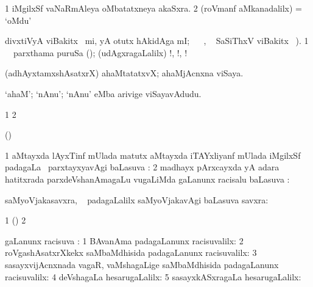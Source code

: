 \bentry
{}
\gl{\nA}
\bmng
\bnum
\num{1} iMgilxSf vaNaRmAleya oMbatatxneya akaSxra. 
\num{2} (roVmanf aMkanadalilx) =  `oMdu'  
\enum
\emng
\eentry

\bentry
{}
\gl{\sanA}
\bmng
 divxtiVyA viBakitx  \ucAcx\ mi, yA otutx hAkidAga mI; \AtAmx\  \pArxparx\ , \bava\  SaSiThxV viBakitx  \bava\ ). 
\bnum
\num{1} \Eva\ \sanA\ parxthama puruSa  (\AmA); (udAgxragaLalilx) !, !, ! 
\enum
\emng
\eentry

\bentry
{}
\gl{\nA}
\bmng
(adhAyxtamxshAsatxrX) ahaMtatatxvX; ahaMjAcnxna viSaya. 
\emng

\noindent
\gl{\pagu}
\bmng
{} `ahaM'; `nAnu'; `nAnu' eMba arivige viSayavAdudu. 
\emng
\eentry

\bentry
{}
\gl{\saMkiSx}
\bmng
\bnum
\num{1}  
\num{2}  
\enum
\emng
\eentry

\bentry
{}
\gl{\saMkeV}
\bmng
(\ravi)  
\emng
\eentry

\bentry
{}
\gl{\uparx}
\bmng
\bnum
\num{1}  aMtayxda lAyxTinf mUlada matutx  aMtayxda iTAYxliyanf mUlada iMgilxSf padagaLa \bava\ parxtayxyavAgi baLasuva \uparx:  
\num{2} madhayx pArxcayxda yA adara hatitxrada parxdeVshanAmagaLu \mo vugaLiMda \gu gaLanunx racisalu baLasuva \uparx:  
\enum
\emng
\eentry

\bentry
{}
\gl{}
\bmng
saMyoVjakasavxra, \kanmu\  padagaLalilx saMyoVjakavAgi baLasuva savxra:  
\emng
\eentry

\bentry
{}
\gl{\saMkiSx}
\bmng
{} 
\emng
\eentry

\bentry
{}
\gl{\saMkiSx}
\bmng
\bnum
\num{1} (\birx)  
\num{2}  
\enum
\emng
\eentry

\bentry
{}
\gl{\uparx}
\bmng
\nA gaLanunx racisuva \uparx: 
\bnum
\num{1} BAvanAma padagaLanunx racisuvalilx:  
\num{2} roVgashAsatxrXkekx saMbaMdhisida padagaLanunx racisuvalilx:  
\num{3} sasayxvijAcnxnada vagaR, vaMshagaLige saMbaMdhisida padagaLanunx racisuvalilx:  
\num{4} deVshagaLa hesarugaLalilx:  
\num{5} sasayxkASxragaLa hesarugaLalilx:  
\enum
\emng
\eentry

